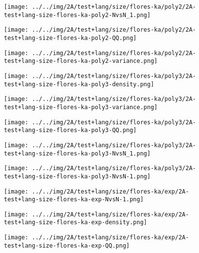 \begin{figure}[H]
\centering	\texttt{[image: ../../img/2A/test+lang/size/flores-ka/poly2/2A-test+lang-size-flores-ka-poly2-NvsN\_1.png]}
\end{figure}
\begin{figure}[H]
\centering	\texttt{[image: ../../img/2A/test+lang/size/flores-ka/poly2/2A-test+lang-size-flores-ka-poly2-QQ.png]}
\end{figure}
\begin{figure}[H]
\centering	\texttt{[image: ../../img/2A/test+lang/size/flores-ka/poly2/2A-test+lang-size-flores-ka-poly2-variance.png]}
\end{figure}
\begin{figure}[H]
\centering	\texttt{[image: ../../img/2A/test+lang/size/flores-ka/poly3/2A-test+lang-size-flores-ka-poly3-density.png]}
\end{figure}
\begin{figure}[H]
\centering	\texttt{[image: ../../img/2A/test+lang/size/flores-ka/poly3/2A-test+lang-size-flores-ka-poly3-variance.png]}
\end{figure}
\begin{figure}[H]
\centering	\texttt{[image: ../../img/2A/test+lang/size/flores-ka/poly3/2A-test+lang-size-flores-ka-poly3-QQ.png]}
\end{figure}
\begin{figure}[H]
\centering	\texttt{[image: ../../img/2A/test+lang/size/flores-ka/poly3/2A-test+lang-size-flores-ka-poly3-NvsN\_1.png]}
\end{figure}
\begin{figure}[H]
\centering	\texttt{[image: ../../img/2A/test+lang/size/flores-ka/poly3/2A-test+lang-size-flores-ka-poly3-NvsN-1.png]}
\end{figure}
\begin{figure}[H]
\centering	\texttt{[image: ../../img/2A/test+lang/size/flores-ka/exp/2A-test+lang-size-flores-ka-exp-NvsN-1.png]}
\end{figure}
\begin{figure}[H]
\centering	\texttt{[image: ../../img/2A/test+lang/size/flores-ka/exp/2A-test+lang-size-flores-ka-exp-density.png]}
\end{figure}
\begin{figure}[H]
\centering	\texttt{[image: ../../img/2A/test+lang/size/flores-ka/exp/2A-test+lang-size-flores-ka-exp-QQ.png]}
\end{figure}
